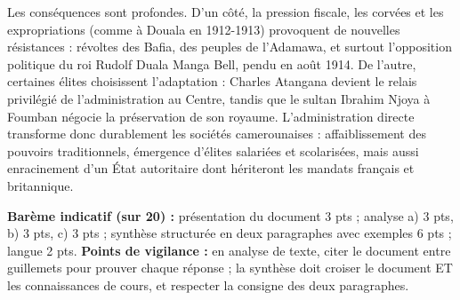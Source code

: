 \documentclass[11pt]{article}
\begin{document}
\begin{corrige}
\begin{enumerate}
    Les conséquences sont profondes. D'un côté, la pression fiscale, les corvées et les expropriations (comme à Douala en 1912-1913) provoquent de nouvelles résistances : révoltes des Bafia, des peuples de l'Adamawa, et surtout l'opposition politique du roi Rudolf Duala Manga Bell, pendu en août 1914. De l'autre, certaines élites choisissent l'adaptation : Charles Atangana devient le relais privilégié de l'administration au Centre, tandis que le sultan Ibrahim Njoya à Foumban négocie la préservation de son royaume. L'administration directe transforme donc durablement les sociétés camerounaises : affaiblissement des pouvoirs traditionnels, émergence d'élites salariées et scolarisées, mais aussi enracinement d'un État autoritaire dont hériteront les mandats français et britannique.
\end{enumerate}
\textbf{Barème indicatif (sur 20) :} présentation du document 3 pts ; analyse a) 3 pts, b) 3 pts, c) 3 pts ; synthèse structurée en deux paragraphes avec exemples 6 pts ; langue 2 pts.
\textbf{Points de vigilance :} en analyse de texte, citer le document entre guillemets pour prouver chaque réponse ; la synthèse doit croiser le document ET les connaissances de cours, et respecter la consigne des deux paragraphes.
\end{corrige}
\end{document}
